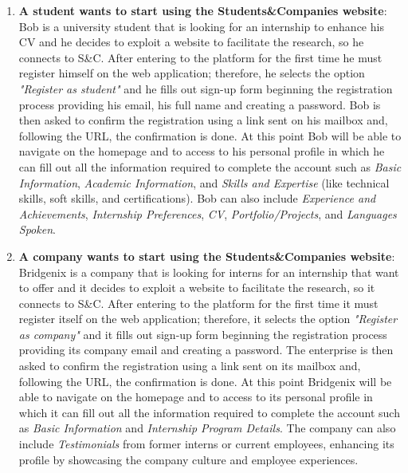 \begin{enumerate}

\item \textbf{A student wants to start using the Students\&Companies website}:
\\Bob is a university student that is looking for an internship to enhance his CV and he decides to exploit a website to facilitate the research, so he connects to S\&C. After entering to the platform for the first time he must register himself on the web application; therefore, he selects the option \textit{"Register as student"} and he fills out sign-up form beginning the registration process providing his email, his full name and creating a password. Bob is then asked to confirm the registration using a link sent on his mailbox and, following the URL, the confirmation is done. At this point Bob will be able to navigate on the homepage and to access to his personal profile in which he can fill out all the information required to complete the account such as \textit{Basic Information}, \textit{Academic Information}, and \textit{Skills and Expertise} (like technical skills, soft skills, and certifications). Bob can also include \textit{Experience and Achievements}, \textit{Internship Preferences}, \textit{CV}, \textit{Portfolio/Projects}, and \textit{Languages Spoken}.

\item \textbf{A company wants to start using the Students\&Companies website}:
\\Bridgenix is a company that is looking for interns for an internship that want to offer and it decides to exploit a website to facilitate the research, so it connects to S\&C. After entering to the platform for the first time it must register itself on the web application; therefore, it selects the option \textit{"Register as company"} and it fills out sign-up form beginning the registration process providing its company email and creating a password. The enterprise is then asked to confirm the registration using a link sent on its mailbox and, following the URL, the confirmation is done. At this point Bridgenix will be able to navigate on the homepage and to access to its personal profile in which it can fill out all the information required to complete the account such as \textit{Basic Information} and \textit{Internship Program Details}. The company can also include \textit{Testimonials} from former interns or current employees, enhancing its profile by showcasing the company culture and employee experiences.


\end{enumerate}
